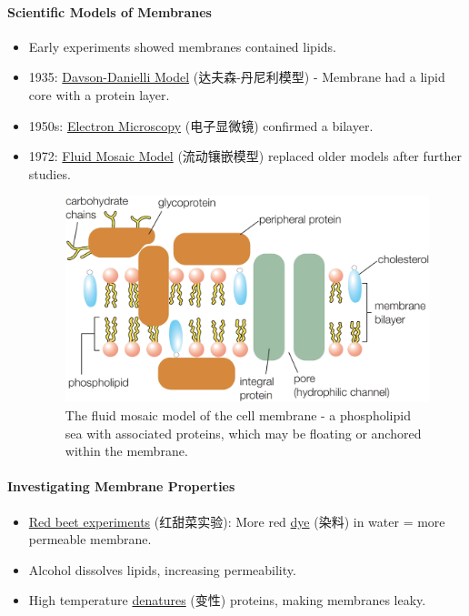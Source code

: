 \paragraph{Scientific Models of Membranes}
\begin{itemize}
    \item Early experiments showed membranes contained lipids.
    \item 1935: \underline{Davson-Danielli Model} (达夫森-丹尼利模型) - Membrane had a lipid core with a protein layer.
    \item 1950s: \underline{Electron Microscopy} (电子显微镜) confirmed a bilayer.
    \item 1972: \underline{Fluid Mosaic Model} (流动镶嵌模型) replaced older models after further studies.
    \begin{figure}[H]
        \centering
        \includegraphics[scale=0.18]{Biology/2A/Images/2A-1-4.png}
        \caption{The fluid mosaic model of the cell membrane - a phospholipid sea with associated proteins, which may be floating
        or anchored within the membrane.}
    \end{figure}
\end{itemize}

\paragraph{Investigating Membrane Properties}
\begin{itemize}
    \item \underline{Red beet experiments} (红甜菜实验): More red \underline{dye} (染料) in water = more permeable membrane.
    \item Alcohol dissolves lipids, increasing permeability.
    \item High temperature \underline{denatures} (变性) proteins, making membranes leaky.
\end{itemize}